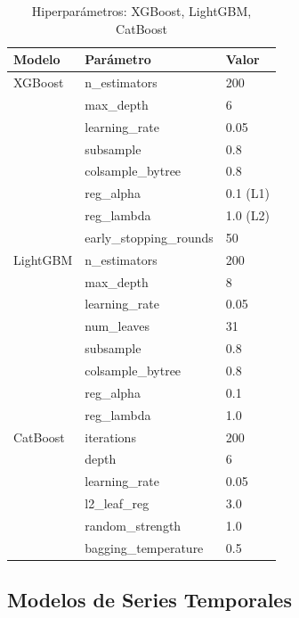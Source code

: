 \begin{table}[htbp]
\centering
\caption{Hiperpar\'ametros: XGBoost, LightGBM, CatBoost}
\label{tab:hyper_gb}
\small
\begin{tabular}{@{}llp{6cm}@{}}
\toprule
\textbf{Modelo} & \textbf{Par\'ametro} & \textbf{Valor} \\
\midrule
XGBoost & n\_estimators & 200 \\
 & max\_depth & 6 \\
 & learning\_rate & 0.05 \\
 & subsample & 0.8 \\
 & colsample\_bytree & 0.8 \\
 & reg\_alpha & 0.1 (L1) \\
 & reg\_lambda & 1.0 (L2) \\
 & early\_stopping\_rounds & 50 \\
\midrule
LightGBM & n\_estimators & 200 \\
 & max\_depth & 8 \\
 & learning\_rate & 0.05 \\
 & num\_leaves & 31 \\
 & subsample & 0.8 \\
 & colsample\_bytree & 0.8 \\
 & reg\_alpha & 0.1 \\
 & reg\_lambda & 1.0 \\
\midrule
CatBoost & iterations & 200 \\
 & depth & 6 \\
 & learning\_rate & 0.05 \\
 & l2\_leaf\_reg & 3.0 \\
 & random\_strength & 1.0 \\
 & bagging\_temperature & 0.5 \\
\bottomrule
\end{tabular}
\end{table}

\subsection{Modelos de Series Temporales}
\label{app:ts_hyperparams}

